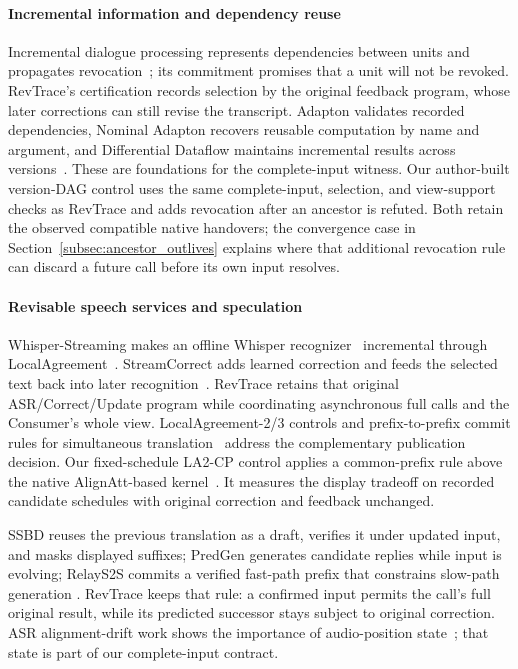 \paragraph{Incremental information and dependency reuse}
Incremental dialogue processing represents dependencies between units
and propagates revocation~\cite{schlangen2011incremental}; its commitment
promises that a unit will not be revoked. RevTrace's certification
records selection by the original feedback program, whose later
corrections can still revise the transcript. Adapton validates recorded
dependencies, Nominal Adapton recovers reusable computation by name and
argument, and Differential Dataflow maintains incremental results across
versions~\cite{hammer2014adapton,hammer2015names,mcsherry2013differential}.
These are foundations for the complete-input witness. Our author-built
version-DAG control uses the same complete-input, selection, and
view-support checks as RevTrace and adds revocation after an ancestor
is refuted. Both retain the observed compatible native handovers; the
convergence case in Section~\ref{subsec:ancestor_outlives} explains
where that additional revocation rule can discard a future call before
its own input resolves.

\paragraph{Revisable speech services and speculation}
Whisper-Streaming makes an offline Whisper
recognizer~\cite{radford2023whisper} incremental through
LocalAgreement~\cite{machacek2023whisperstreaming}. StreamCorrect adds
learned correction and feeds the selected text back into later
recognition~\cite{vu2026streamcorrect}. RevTrace retains that original
ASR/Correct/Update program while coordinating asynchronous full calls
and the Consumer's whole view. LocalAgreement-2/3 controls and
prefix-to-prefix commit rules for simultaneous
translation~\cite{ma2019stacl} address the complementary publication
decision. Our fixed-schedule LA2-CP control applies a common-prefix rule
above the native AlignAtt-based kernel~\cite{papi2023alignatt}. It
measures the display tradeoff on recorded candidate schedules with
original correction and feedback unchanged.

SSBD reuses the previous translation as a draft, verifies it under
updated input, and masks displayed suffixes; PredGen generates candidate
replies while input is evolving; RelayS2S commits a verified fast-path
prefix that constrains slow-path generation
\cite{zeng2026ssbd,li2025predgen,mai2026relays2s}. RevTrace keeps that
rule: a confirmed input permits the call's full original result, while
its predicted successor stays subject to original correction. ASR
alignment-drift work shows the
importance of audio-position state~\cite{wang2026alignmentdrift}; that
state is part of our complete-input contract.

